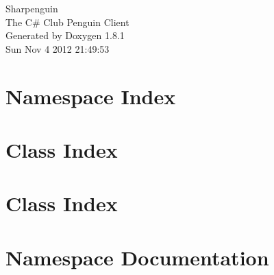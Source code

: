 \documentclass{book}
\begin{document}
\hypersetup{pageanchor=false,citecolor=blue}
\begin{titlepage}
\vspace*{7cm}
\begin{center}
{\Large Sharpenguin \\[1ex]\large The C\# Club Penguin Client }\\
\vspace*{1cm}
{\large Generated by Doxygen 1.8.1}\\
\vspace*{0.5cm}
{\small Sun Nov 4 2012 21:49:53}\\
\end{center}
\end{titlepage}
\clearemptydoublepage
{}
\tableofcontents
\clearemptydoublepage
{}
\hypersetup{pageanchor=true,citecolor=blue}
\chapter{Namespace Index}

\chapter{Class Index}

\chapter{Class Index}

\chapter{Namespace Documentation}










\end{document}
